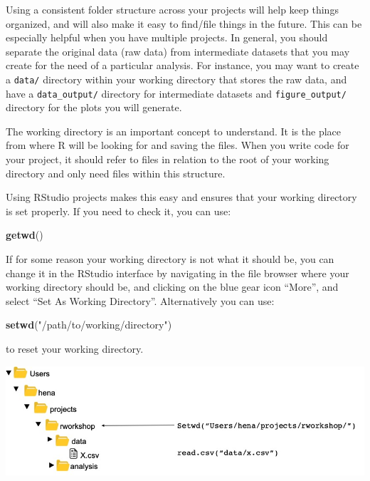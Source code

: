 \documentclass[
]{book}
\newenvironment{Shaded}{\begin{snugshade}}{\end{snugshade}}
\newcommand{\FunctionTok}[1]{\textcolor[rgb]{0.13,0.29,0.53}{\textbf{#1}}}
\newcommand{\NormalTok}[1]{#1}
\newcommand{\StringTok}[1]{\textcolor[rgb]{0.31,0.60,0.02}{#1}}
\begin{document}
Using a consistent folder structure across your projects will help keep things organized, and will also make it easy to find/file things in the future. This can be especially helpful when you have multiple projects. In general, you should separate the original data (raw data) from intermediate datasets that you may create for the need of a particular analysis. For instance, you may want to create a \texttt{data/} directory within your working directory that stores the raw data, and have a \texttt{data\_output/} directory for intermediate datasets and \texttt{figure\_output/} directory for the plots you will generate.

The working directory is an important concept to understand. It is the place from where R will be looking for and saving the files. When you write code for your project, it should refer to files in relation to the root of your working directory and only need files within this structure.

Using RStudio projects makes this easy and ensures that your working directory is set properly. If you need to check it, you can use:

\begin{Shaded}
\begin{Highlighting}[]
\FunctionTok{getwd}\NormalTok{()}
\end{Highlighting}
\end{Shaded}

If for some reason your working directory is not what it should be, you can change it in the RStudio interface by navigating in the file browser where your working directory should be, and clicking on the blue gear icon ``More'', and select ``Set As Working Directory''. Alternatively you can use:

\begin{Shaded}
\begin{Highlighting}[]
\FunctionTok{setwd}\NormalTok{(}\StringTok{"/path/to/working/directory"}\NormalTok{)}
\end{Highlighting}
\end{Shaded}

to reset your working directory.

\includegraphics{filepath.jpg}
\end{document}
